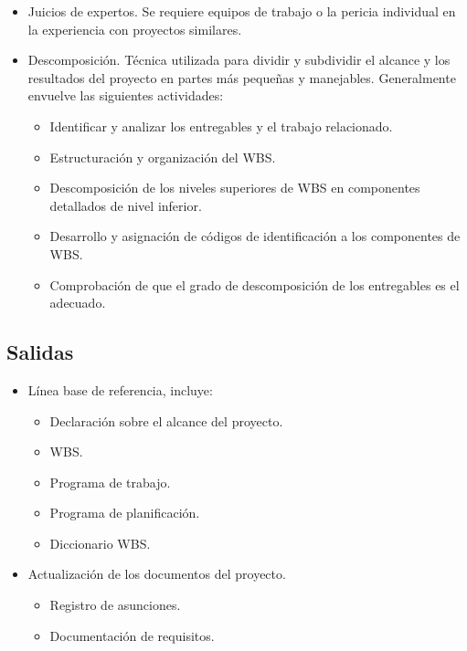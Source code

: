 \documentclass[letterpaper,12pt,openright,oneside]{article}
\theoremstyle{plain}
\begin{document}
\begin{itemize}
    \item Juicios de expertos. Se requiere equipos de trabajo o la pericia individual en la experiencia con proyectos similares.
    \item Descomposición. Técnica utilizada para dividir y subdividir el alcance y los resultados del proyecto en partes más pequeñas y manejables. Generalmente envuelve las siguientes actividades:
        \begin{itemize}
            \item Identificar y analizar los entregables y el trabajo relacionado.
            \item Estructuración y organización del WBS.
            \item Descomposición de los niveles superiores de WBS en componentes detallados de nivel inferior.
            \item Desarrollo y asignación de códigos de identificación a los componentes de WBS.
            \item Comprobación de que el grado de descomposición de los entregables es el adecuado.
        \end{itemize}
\end{itemize}
% 
% 
\subsection*{Salidas}

\begin{itemize}
    \item Línea base de referencia, incluye:
        \begin{itemize}
            \item Declaración sobre el alcance del proyecto.
            \item WBS.
            \item Programa de trabajo.
            \item Programa de planificación.
            \item Diccionario WBS.
        \end{itemize}
    \item Actualización de los documentos del proyecto.
        \begin{itemize}
            \item Registro de asunciones.
            \item Documentación de requisitos.
        \end{itemize}
\end{itemize}

\end{document}
